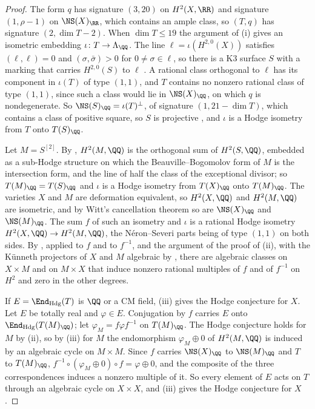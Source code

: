 \begin{proof}
The form $q$ has signature $(3,20)$ on $H^{2}(X,\RR)$ and signature
$(1,\rho-1)$ on $\NS(X)_{\RR}$, which contains an ample class, so $(T,q)$ has
signature $(2,\dim T-2)$. When $\dim T\le19$ the argument of
(i) gives an isometric embedding
$\iota\colon T\to\Lambda_{\QQ}$. The line $\ell=\iota(H^{2,0}(X))$ satisfies
$(\ell,\ell)=0$ and $(\sigma,\bar\sigma)>0$ for $0\ne\sigma\in\ell$, so there
is a K3 surface $S$ with a marking that carries $H^{2,0}(S)$ to $\ell$
\cite[Chs.~6--7]{Huy16}. A rational class orthogonal to $\ell$ has its
component in $\iota(T)$ of type $(1,1)$, and $T$ contains no nonzero rational
class of type $(1,1)$, since such a class would lie in $\NS(X)_{\QQ}$, on
which $q$ is nondegenerate. So $\NS(S)_{\QQ}=\iota(T)^{\perp}$, of signature
$(1,21-\dim T)$, which contains a class of positive square, so $S$ is
projective \cite[Ch.~8]{Huy16}, and $\iota$ is a Hodge isometry from $T$ onto
$T(S)_{\QQ}$.

Let $M=S^{[2]}$. By \cite{Bea83}, $H^{2}(M,\QQ)$ is the orthogonal sum of
$H^{2}(S,\QQ)$, embedded as a sub-Hodge structure on which the
Beauville--Bogomolov form of $M$ is the intersection form, and the line of
half the class of the exceptional divisor; so $T(M)_{\QQ}=T(S)_{\QQ}$ and
$\iota$ is a Hodge isometry from $T(X)_{\QQ}$ onto $T(M)_{\QQ}$. The
varieties $X$ and $M$ are deformation equivalent, so $H^{2}(X,\QQ)$ and
$H^{2}(M,\QQ)$ are isometric, and by Witt's cancellation theorem so are
$\NS(X)_{\QQ}$ and $\NS(M)_{\QQ}$. The sum $f$ of such an isometry and
$\iota$ is a rational Hodge isometry $H^{2}(X,\QQ)\to H^{2}(M,\QQ)$, the
N\'eron--Severi parts being of type $(1,1)$ on both sides. By
\cite[Theorem~1.1]{Mar24}, applied to $f$ and to $f^{-1}$, and the argument
of the proof of (ii), with the K\"unneth projectors of
$X$ and $M$ algebraic by \cite[Theorem~1.1]{CM13}, there are algebraic
classes on $X\times M$ and on $M\times X$ that induce nonzero rational
multiples of $f$ and of $f^{-1}$ on $H^{2}$ and zero in the other degrees.

If $E=\End_{\mathrm{Hdg}}(T)$ is $\QQ$ or a CM field,
(iii) gives the Hodge conjecture for $X$. Let $E$ be
totally real and $\varphi\in E$. Conjugation by $f$ carries $E$ onto
$\End_{\mathrm{Hdg}}(T(M)_{\QQ})$; let $\varphi_{M}=f\varphi f^{-1}$ on
$T(M)_{\QQ}$. The Hodge conjecture holds for $M$ by (ii), so
by (iii) for $M$ the endomorphism $\varphi_{M}\oplus0$ of
$H^{2}(M,\QQ)$ is induced by an algebraic cycle on $M\times M$. Since $f$
carries $\NS(X)_{\QQ}$ to $\NS(M)_{\QQ}$ and $T$ to $T(M)_{\QQ}$,
$f^{-1}\circ(\varphi_{M}\oplus0)\circ f=\varphi\oplus0$, and the composite
of the three correspondences \cite[\S16.1]{Ful98} induces a nonzero multiple
of it. So every element of $E$ acts on $T$ through an algebraic cycle on
$X\times X$, and (iii) gives the Hodge conjecture for
$X$.


\end{proof}

